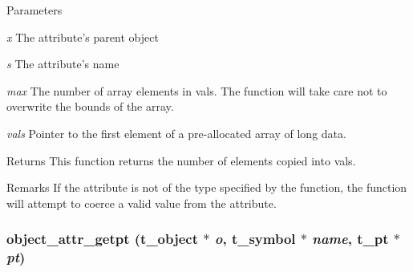 \begin{DoxyParams}{Parameters}
\item[{\em x}]The attribute's parent object \item[{\em s}]The attribute's name \item[{\em max}]The number of array elements in {\ttfamily vals}. The function will take care not to overwrite the bounds of the array. \item[{\em vals}]Pointer to the first element of a pre-\/allocated array of long data.\end{DoxyParams}
\begin{DoxyReturn}{Returns}
This function returns the number of elements copied into {\ttfamily vals}.
\end{DoxyReturn}
\begin{DoxyRemark}{Remarks}
If the attribute is not of the type specified by the function, the function will attempt to coerce a valid value from the attribute. 
\end{DoxyRemark}
\hypertarget{group__attr_ga2d19381844031e8a2cb80390fad6d3af}{
\subsubsection[{object\_\-attr\_\-getpt}]{ object\_\-attr\_\-getpt ({\bf t\_\-object} $\ast$ {\em o}, \/  {\bf t\_\-symbol} $\ast$ {\em name}, \/  {\bf t\_\-pt} $\ast$ {\em pt})}}
\label{group__attr_ga2d19381844031e8a2cb80390fad6d3af}


